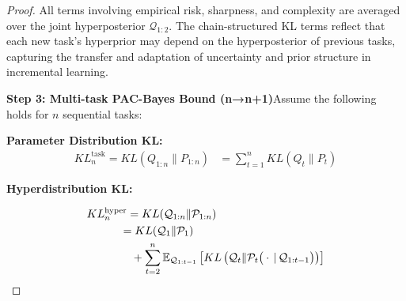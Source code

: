 \documentclass[letterpaper]{article} %
\begin{document}
\begin{proof}


 All terms involving empirical risk, sharpness, and complexity are averaged over the joint hyperposterior $\mathcal{Q}_{1:2}$. The chain-structured KL terms reflect that each new task's hyperprior may depend on the hyperposterior of previous tasks, capturing the transfer and adaptation of uncertainty and prior structure in incremental learning.


\textbf{Step 3: Multi-task PAC-Bayes Bound (n→n+1)}Assume the following holds for $n$ sequential tasks:


\textbf{Parameter Distribution KL:}
    \begin{align}
     KL^{\text{task}}_n=KL(Q_{1:n} \| P_{1:n}) 
    &= \sum_{t=1}^n KL(Q_t \| P_t)
    \end{align}

 
\textbf{Hyperdistribution KL:}


     \begin{align}
    &KL^{\text{hyper}}_n =KL(\mathcal{Q}_{1:n} \| \mathcal{P}_{1:n}) \notag \\
    & \quad  \qquad= KL(\mathcal{Q}_1 \| \mathcal{P}_1) \notag  \\
      & \qquad \qquad + \sum_{t=2}^n 
        \mathbb{E}_{\mathcal{Q}_{1:t-1}} \left[ 
            KL\left(\mathcal{Q}_t \| \mathcal{P}_t\big(\cdot\,|\,\mathcal{Q}_{1:t-1}\big)\right) 
        \right]
    \end{align}


\end{proof}
\end{document}
